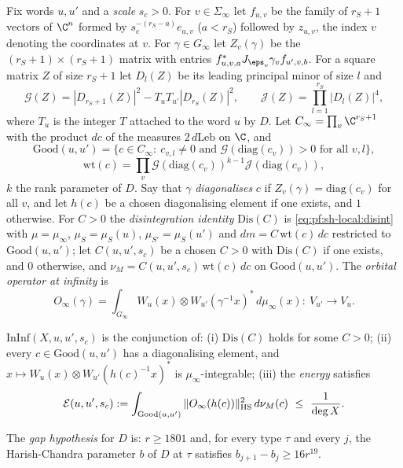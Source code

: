 Fix words $u,u'$ and a \emph{scale} $s_c>0$. For $v\in\Sigma_\infty$ let $f_{u,v}$ be the family of $r_S+1$
vectors of $\C^n$ formed by $s_c^{-(r_S-a)}e_{a,v}$ ($a<r_S$) followed by $z_{u,v}$, the index $v$ denoting the
coordinates at $v$. For $\gamma\in G_\infty$ let $Z_v(\gamma)$ be the $(r_S+1)\times(r_S+1)$ matrix with entries
$f_{u,v,a}^*J_{\eps_v}\gamma_vf_{u',v,b}$. For a square matrix $Z$ of size $r_S+1$ let $D_l(Z)$ be its leading
principal minor of size $l$ and
\[
\mathcal G(Z)=|D_{r_S+1}(Z)|^2-T_uT_{u'}|D_{r_S}(Z)|^2,\qquad \mathcal J(Z)=\prod_{l=1}^{r_S}|D_l(Z)|^4,
\]
where $T_u$ is the integer $T$ attached to the word $u$ by $D$. Let $C_\infty=\prod_{v}\C^{r_S+1}$ with the product
$dc$ of the measures $2\,d\mathrm{Leb}$ on $\C$, and
\[
\mathrm{Good}(u,u')=\{c\in C_\infty:\ c_{v,l}\ne0\text{ and }\mathcal G(\mathrm{diag}(c_v))>0\text{ for all }v,l\},
\]
\[
\mathrm{wt}(c)=\prod_v\mathcal G(\mathrm{diag}(c_v))^{k-1}\mathcal J(\mathrm{diag}(c_v)),
\]
$k$ the rank parameter of $D$. Say that $\gamma$ \emph{diagonalises} $c$ if $Z_v(\gamma)=\mathrm{diag}(c_v)$ for all
$v$, and let $h(c)$ be a chosen diagonalising element if one exists, and $1$ otherwise. For $C>0$ the
\emph{disintegration identity} $\mathrm{Dis}(C)$ is \eqref{eq:pf:sh-local:disint} with $\mu=\mu_\infty$,
$\mu_S=\mu_S(u)$, $\mu_{S'}=\mu_S(u')$ and $dm=C\,\mathrm{wt}(c)\,dc$ restricted to $\mathrm{Good}(u,u')$; let
$C(u,u',s_c)$ be a chosen $C>0$ with $\mathrm{Dis}(C)$ if one exists, and $0$ otherwise, and
$\nu_M=C(u,u',s_c)\,\mathrm{wt}(c)\,dc$ on $\mathrm{Good}(u,u')$. The \emph{orbital operator at infinity} is
\[
O_\infty(\gamma)=\int_{G_\infty}W_u(x)\otimes W_{u'}(\gamma^{-1}x)^*\,d\mu_\infty(x):\ V_{u'}\to V_u .
\]

\begin{definition}\label{pf:sh-local:def:ininf}
$\mathrm{InInf}(X,u,u',s_c)$ is the conjunction of: (i) $\mathrm{Dis}(C)$ holds for some $C>0$; (ii) every
$c\in\mathrm{Good}(u,u')$ has a diagonalising element, and $x\mapsto W_u(x)\otimes W_{u'}(h(c)^{-1}x)^*$ is
$\mu_\infty$-integrable; (iii) the \emph{energy} satisfies
\[
\shlocalE(u,u',s_c):=\int_{\mathrm{Good}(u,u')}\shlocalHS{O_\infty(h(c))}^2\,d\nu_M(c)\ \le\ \frac1{\deg X}.
\]
\end{definition}

\begin{definition}\label{pf:sh-local:def:gap}
The \emph{gap hypothesis} for $D$ is: $r\ge1801$ and, for every type $\tau$ and every $j$, the Harish-Chandra
parameter $b$ of $D$ at $\tau$ satisfies $b_{j+1}-b_j\ge16r^{19}$.
\end{definition}


